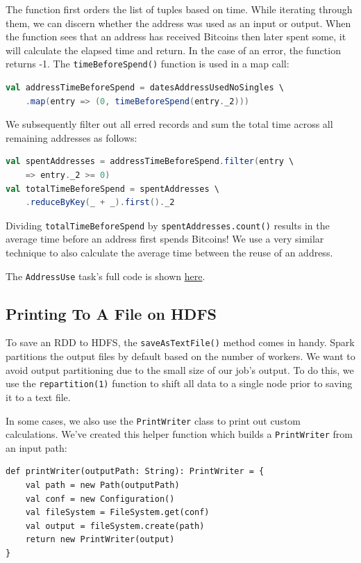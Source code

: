 \documentclass[9pt,twocolumn,twoside]{idsi}
\begin{document}
The function first orders the list of tuples based on time. While iterating through them, we can discern whether the address was used as an input or output. When the function sees that an address has received Bitcoins then later spent some, it will calculate the elapsed time and return. In the case of an error, the function returns -1. The \lstinline{timeBeforeSpend()} function is used in a map call:

\begin{lstlisting}[language=Scala]
val addressTimeBeforeSpend = datesAddressUsedNoSingles \
    .map(entry => (0, timeBeforeSpend(entry._2)))
\end{lstlisting}

We subsequently filter out all erred records and sum the total time across all remaining addresses as follows:

\begin{lstlisting}[language=Scala]
val spentAddresses = addressTimeBeforeSpend.filter(entry \
    => entry._2 >= 0)
val totalTimeBeforeSpend = spentAddresses \
    .reduceByKey(_ + _).first()._2
\end{lstlisting}

Dividing \lstinline{totalTimeBeforeSpend} by \lstinline{spentAddresses.count()} results in the average time before an address first spends Bitcoins! We use a very similar technique to also calculate the average time between the reuse of an address.

The \lstinline{AddressUse} task's full code is shown \href{https://github.com/nishilshah17/idsi_bitcoin/blob/master/analyze_blockchain/src/main/scala/AddressReuse.scala}{here}.

\subsection{Printing To A File on HDFS}

To save an RDD to HDFS, the \lstinline{saveAsTextFile()} method comes in handy. Spark partitions the output files by default based on the number of workers. We want to avoid output partitioning due to the small size of our job's output. To do this, we use the \lstinline{repartition(1)} function to shift all data to a single node prior to saving it to a text file.

In some cases, we also use the \lstinline{PrintWriter} class to print out custom calculations. We've created this helper function which builds a \lstinline{PrintWriter} from an input path:

\begin{lstlisting}
def printWriter(outputPath: String): PrintWriter = {
    val path = new Path(outputPath)
    val conf = new Configuration()
    val fileSystem = FileSystem.get(conf)
    val output = fileSystem.create(path)
    return new PrintWriter(output)
}
\end{lstlisting}
\end{document}
